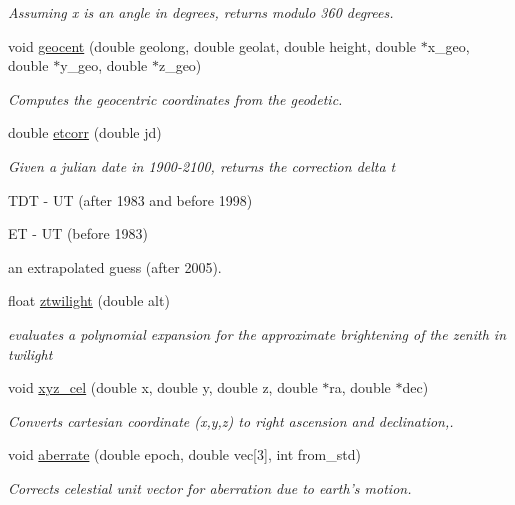 \begin{DoxyCompactItemize}
\begin{DoxyCompactList}\small\item\em Assuming x is an angle in degrees, returns modulo 360 degrees. \end{DoxyCompactList}\item 
void \hyperlink{class_astronomy_a6ae9aacaca91938a2f0f6e6a2b4b13a9}{geocent} (double geolong, double geolat, double height, double $\ast$x\-\_\-geo, double $\ast$y\-\_\-geo, double $\ast$z\-\_\-geo)
\begin{DoxyCompactList}\small\item\em Computes the geocentric coordinates from the geodetic. \end{DoxyCompactList}\item 
double \hyperlink{class_astronomy_afe6cc3c740a1b01fa7052929a19fc093}{etcorr} (double jd)
\begin{DoxyCompactList}\small\item\em Given a julian date in 1900-\/2100, returns the correction delta t\par
 T\-D\-T -\/ U\-T (after 1983 and before 1998)\par
 E\-T -\/ U\-T (before 1983)\par
 an extrapolated guess (after 2005). \end{DoxyCompactList}\item 
float \hyperlink{class_astronomy_a3005e80e642a50974c7aa06fc7b441b4}{ztwilight} (double alt)
\begin{DoxyCompactList}\small\item\em evaluates a polynomial expansion for the approximate brightening of the zenith in twilight \end{DoxyCompactList}\item 
void \hyperlink{class_astronomy_aa5b4524c949894871e56d4b092d02244}{xyz\-\_\-cel} (double x, double y, double z, double $\ast$ra, double $\ast$dec)
\begin{DoxyCompactList}\small\item\em Converts cartesian coordinate (x,y,z) to right ascension and declination,. \end{DoxyCompactList}\item 
void \hyperlink{class_astronomy_a0bdf58295faad385013fbacb73c472a2}{aberrate} (double epoch, double vec\mbox{[}3\mbox{]}, int from\-\_\-std)
\begin{DoxyCompactList}\small\item\em Corrects celestial unit vector for aberration due to earth's motion. \end{DoxyCompactList}\item 

\end{DoxyCompactItemize}
